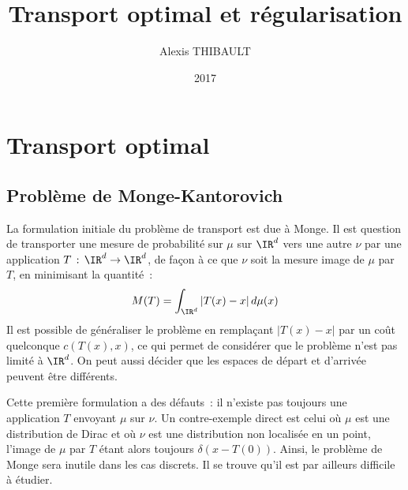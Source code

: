 
\usepackage{subcaption}

\DeclareMathOperator{\diag}{\mathbf{diag}}
\DeclareMathOperator{\Ccal}{\mathcal{C}}

\newcommand{\tab}{\ \ \ \ }

\title{Transport optimal et régularisation}
\author{Alexis THIBAULT}
\date{2017}



\maketitle

\tableofcontents

\section{Transport optimal}

\subsection{Problème de Monge-Kantorovich}
La formulation initiale du problème de transport est due à Monge. Il est question de transporter une mesure de probabilité sur $\mu$ sur $\IR^d$ vers une autre $\nu$ par une application $T\,:\,\IR^d \rightarrow \IR^d$, de façon à ce que $\nu$ soit la mesure image de $\mu$ par $T$, en minimisant la quantité~:
\begin{equation}
\label{eq:monge}
M(T) = \int_{\IR^d} |T(x)-x|\,d\mu(x)
\end{equation}
Il est possible de généraliser le problème en remplaçant $|T(x)-x|$ par un coût quelconque $c(T(x),x)$, ce qui permet de considérer que le problème n'est pas limité à $\IR^d$. On peut aussi décider que les espaces de départ et d'arrivée peuvent être différents.

Cette première formulation a des défauts~: il n'existe pas toujours une application $T$ envoyant $\mu$ sur $\nu$. Un contre-exemple direct est celui où $\mu$ est une distribution de Dirac et où $\nu$ est une distribution non localisée en un point, l'image de $\mu$ par $T$ étant alors toujours $\delta(x-T(0))$. Ainsi, le problème de Monge sera inutile dans les cas discrets. Il se trouve qu'il est par ailleurs difficile à étudier.

